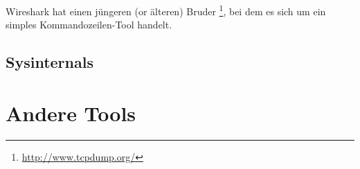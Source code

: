 Wireshark hat einen jüngeren (or älteren) Bruder \footnote{\url{http://www.tcpdump.org/}},
bei dem es sich um ein simples Kommandozeilen-Tool handelt.

\subsection{Sysinternals}

%
%
%
%
%
%
%
%
\section{Andere Tools}

